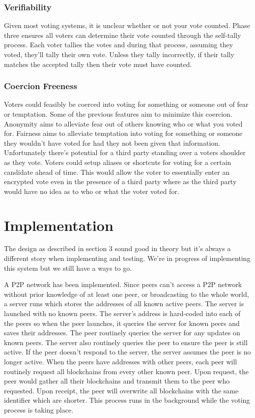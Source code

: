 \documentclass[conference]{IEEEtran}
\begin{document}
\subsubsection{Verifiability}
Given most voting systems, it is unclear whether or not your vote counted. Phase three ensures all voters can determine their vote counted through the self-tally process. Each voter tallies the votes and during that process, assuming they voted, they'll tally their own vote. Unless they tally incorrectly, if their tally matches the accepted tally then their vote must have counted. 

\subsubsection{Coercion Freeness}
Voters could feasibly be coerced into voting for something or someone out of fear or temptation. Some of the previous features aim to minimize this coercion. Anonymity aims to alleviate fear out of others knowing who or what you voted for. Fairness aims to alleviate temptation into voting for something or someone they wouldn't have voted for had they not been given that information. Unfortunately there's potential for a third party standing over a voters shoulder as they vote. Voters could setup aliases or shortcuts for voting for a certain candidate ahead of time. This would allow the voter to essentially enter an encrypted vote even in the presence of a third party where as the third party would have no idea as to who or what the voter voted for. 

\section{Implementation}
The design as described in section 3 sound good in theory but it's always a different story when implementing and testing. We're in progress of implementing this system but we still have a ways to go.

A P2P network has been implemented. Since peers can't access a P2P network without prior knowledge of at least one peer, or broadcasting to the whole world, a server runs which stores the addresses of all known active peers. The server is launched with no known peers. The server's address is hard-coded into each of the peers so when the peer launches, it queries the server for known peers and saves their addresses. The peer routinely queries the server for any updates on known peers. The server also routinely queries the peer to ensure the peer is still active. If the peer doesn't respond to the server, the server assumes the peer is no longer active. When the peers have addresses with other peers, each peer will routinely request all blockchains from every other known peer. Upon request, the peer would gather all their blockchains and transmit them to the peer who requested. Upon receipt, the peer will overwrite all blockchains with the same identifier which are shorter. This process runs in the background while the voting process is taking place.
\end{document}
